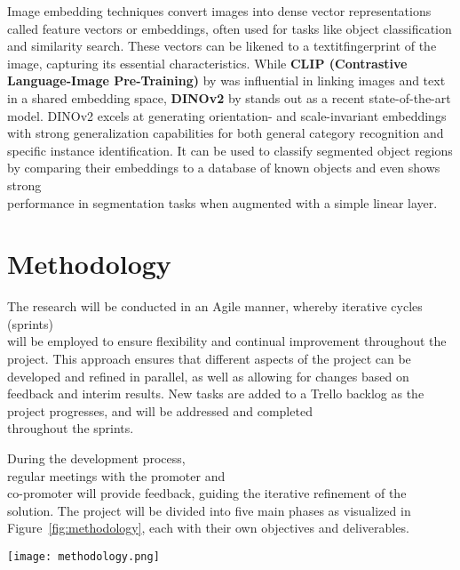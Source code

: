 \documentclass[english]{hogent-article}
\begin{document}
Image embedding techniques convert images into dense vector representations called feature vectors or embeddings, 
often used for tasks like object classification and similarity search.
These vectors can be likened to a textit{fingerprint} of the image, capturing its essential characteristics.
While \textbf{CLIP (Contrastive Language-Image Pre-Training)} by \textcite{Radford2021} was influential in linking images and text in a shared embedding space,
\textbf{DINOv2} by \textcite{Oquab2024} stands out as a recent state-of-the-art model. 
DINOv2 excels at generating orientation- and scale-invariant embeddings with strong generalization capabilities 
for both general category recognition and specific instance identification. 
It can be used to classify segmented object regions by comparing their embeddings to a database of 
known objects and even shows strong\\ performance in segmentation tasks when augmented with a simple linear layer.

\section{Methodology}
\label{sec:methodology}

The research will be conducted in an Agile manner, whereby iterative cycles (sprints)\\ will be employed 
to ensure flexibility and continual improvement throughout the project.
This approach ensures that different aspects of the project can be developed and refined in parallel, 
as well as allowing for changes based on feedback and interim results.
New tasks are added to a Trello backlog as the project progresses, and will be addressed and completed\\ throughout the sprints.

During the development process,\\ regular meetings with the promoter and\\ co-promoter will provide feedback, guiding the iterative refinement of the solution.
The project will be divided into five main phases as visualized in Figure~\ref{fig:methodology}, each with their own objectives and deliverables.

\begin{figure*}
  \centering
  \texttt{[image: methodology.png]}
  \caption[]{\label{fig:methodology}
    Overview of the project phases, their deliverables, and the relationships between them.
  }
\end{figure*}
\end{document}
